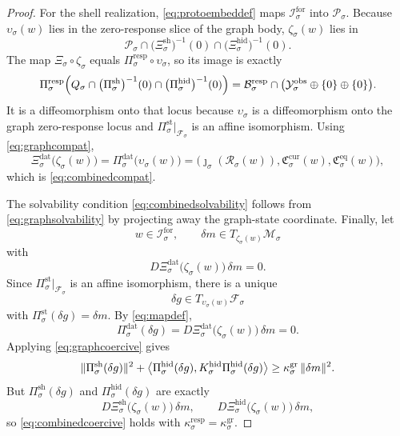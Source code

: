 \documentclass[11pt]{article}
\newcommand{\ForSpace}[1]{\mathcal I_{#1}^{\mathrm{for}}}
\newcommand{\Reduction}[1]{\mathcal R_{#1}}
\newcommand{\CurrentCarrier}[1]{\mathfrak C_{#1}^{\mathrm{cur}}}
\newcommand{\EqCarrier}[1]{\mathfrak C_{#1}^{\mathrm{eq}}}
\newcommand{\DataSpace}[1]{\mathcal Y_{#1}^{\mathrm{obs}}}
\newcommand{\ProtoSpace}[1]{\mathcal M_{#1}}
\newcommand{\ProtoBody}[1]{\mathcal P_{#1}}
\newcommand{\ResponseMap}[1]{\Xi_{#1}}
\newcommand{\ResponseData}[1]{\Xi_{#1}^{\mathrm{dat}}}
\newcommand{\ResponseShell}[1]{\Xi_{#1}^{\mathrm{sh}}}
\newcommand{\ResponseHidden}[1]{\Xi_{#1}^{\mathrm{hid}}}
\newcommand{\ResponseImage}[1]{\mathcal B_{#1}^{\mathrm{resp}}}
\newcommand{\HiddenOperator}[1]{K_{#1}^{\mathrm{hid}}}
\newcommand{\ProtoEmbed}[1]{\zeta_{#1}}
\newcommand{\GraphAffine}[1]{\mathcal F_{#1}}
\newcommand{\GraphBody}[1]{Q_{#1}}
\newcommand{\StateProj}[1]{\Pi_{#1}^{\mathrm{st}}}
\newcommand{\RespProj}[1]{\Pi_{#1}^{\mathrm{resp}}}
\newcommand{\GraphDataProj}[1]{\Pi_{#1}^{\mathrm{dat}}}
\newcommand{\GraphShellProj}[1]{\Pi_{#1}^{\mathrm{sh}}}
\newcommand{\GraphHiddenProj}[1]{\Pi_{#1}^{\mathrm{hid}}}
\newcommand{\GraphEmbed}[1]{\upsilon_{#1}}
\begin{document}
\begin{proof}
For the shell realization, \eqref{eq:protoembeddef} maps \(\ForSpace{\sigma}\) into \(\ProtoBody{\sigma}\). Because \(\GraphEmbed{\sigma}(w)\) lies in the zero-response slice of the graph body, \(\ProtoEmbed{\sigma}(w)\) lies in
\[
\ProtoBody{\sigma}\cap
\bigl(\ResponseShell{\sigma}\bigr)^{-1}(0)\cap
\bigl(\ResponseHidden{\sigma}\bigr)^{-1}(0).
\]
The map \(\ResponseMap{\sigma}\circ\ProtoEmbed{\sigma}\) equals \(\RespProj{\sigma}\circ \GraphEmbed{\sigma}\), so its image is exactly
\[
\RespProj{\sigma}
\Bigl(
\GraphBody{\sigma}\cap
\bigl(\GraphShellProj{\sigma}\bigr)^{-1}(0)\cap
\bigl(\GraphHiddenProj{\sigma}\bigr)^{-1}(0)
\Bigr)
=
\ResponseImage{\sigma}\cap
\bigl(
\DataSpace{\sigma}\oplus\{0\}\oplus\{0\}
\bigr).
\]
It is a diffeomorphism onto that locus because \(\GraphEmbed{\sigma}\) is a diffeomorphism onto the graph zero-response locus and \(\StateProj{\sigma}\big|_{\GraphAffine{\sigma}}\) is an affine isomorphism. Using \eqref{eq:graphcompat},
\[
\ResponseData{\sigma}\bigl(\ProtoEmbed{\sigma}(w)\bigr)
=
\GraphDataProj{\sigma}\bigl(\GraphEmbed{\sigma}(w)\bigr)
=
\bigl(
\jmath_{\sigma}(\Reduction{\sigma}(w)),
\CurrentCarrier{\sigma}(w),
\EqCarrier{\sigma}(w)
\bigr),
\]
which is \eqref{eq:combinedcompat}.

The solvability condition \eqref{eq:combinedsolvability} follows from \eqref{eq:graphsolvability} by projecting away the graph-state coordinate. Finally, let
\[
w\in\ForSpace{\sigma},
\qquad
\delta m\in T_{\ProtoEmbed{\sigma}(w)}\ProtoSpace{\sigma}
\]
with
\[
D\ResponseData{\sigma}\bigl(\ProtoEmbed{\sigma}(w)\bigr)\,\delta m=0.
\]
Since \(\StateProj{\sigma}\big|_{\GraphAffine{\sigma}}\) is an affine isomorphism, there is a unique
\[
\delta g\in T_{\GraphEmbed{\sigma}(w)}\GraphAffine{\sigma}
\]
with \(\StateProj{\sigma}(\delta g)=\delta m\). By \eqref{eq:mapdef},
\[
\GraphDataProj{\sigma}(\delta g)
=
D\ResponseData{\sigma}\bigl(\ProtoEmbed{\sigma}(w)\bigr)\,\delta m
=0.
\]
Applying \eqref{eq:graphcoercive} gives
\[
\|\GraphShellProj{\sigma}(\delta g)\|^{2}
+
\ev{
\GraphHiddenProj{\sigma}(\delta g),
\HiddenOperator{\sigma}\GraphHiddenProj{\sigma}(\delta g)
}
\ge
\kappa_{\sigma}^{\mathrm{gr}}\,
\|\delta m\|^{2}.
\]
But \(\GraphShellProj{\sigma}(\delta g)\) and \(\GraphHiddenProj{\sigma}(\delta g)\) are exactly
\[
D\ResponseShell{\sigma}\bigl(\ProtoEmbed{\sigma}(w)\bigr)\,\delta m,
\qquad
D\ResponseHidden{\sigma}\bigl(\ProtoEmbed{\sigma}(w)\bigr)\,\delta m,
\]
so \eqref{eq:combinedcoercive} holds with \(\kappa_{\sigma}^{\mathrm{resp}}=\kappa_{\sigma}^{\mathrm{gr}}\).
\end{proof}
\end{document}
